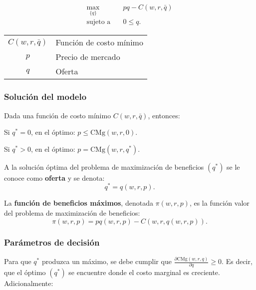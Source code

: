 \documentclass[8pt,a4paper]{extarticle}
\begin{document}
\begin{multicols}{3}
\begin{equation*}
\begin{aligned}
	\max_{\{q\}}\         & pq - C(w, r, \bar{q}) \\
    \text{sujeto a} \quad & 0 \le q.
\end{aligned}
\end{equation*}

\begin{center}
\begin{tabular}{ c l }
    \hline
	$C(w, r, \bar{q})$ & Función de costo mínimo \\
    $p$ & Precio de mercado \\
    $q$ & Oferta \\
    \hline
\end{tabular}
\end{center}

\subsubsection*{Solución del modelo}

Dada una función de costo mínimo $C (w, r, \bar{q})$, entonces:

\begin{bulletlist}
\item Si $q^* = 0$, en el óptimo: $p \le \text{CMg} (w, r, 0)$.
\item Si $q^* > 0$, en el óptimo: $p = \text{CMg} (w, r, q^*)$.
\end{bulletlist}

\begin{boxdef}[Oferta]
	A la solución óptima del problema de maximización de beneficios $(q^*)$ se le conoce como \textbf{oferta} y se denota:
	\[
		q^* = q(w, r, p)
	.\] 
\end{boxdef}

\begin{boxdef}
	La \textbf{función de beneficios máximos}, denotada $\pi(w, r, p)$, es la función valor del problema de maximización de beneficios:
	\[
		\pi (w, r, p) = pq(w, r, p) - C (w, r, q(w, r, p))
	.\] 
\end{boxdef}

\subsubsection*{Parámetros de decisión}

Para que $q^*$ produzca un máximo, se debe cumplir que $\displaystyle \frac{\partial \text{CMg} (w, r, q)}{\partial q} \ge 0$. Es decir, que el óptimo $(q^*)$ se encuentre donde el costo marginal es creciente. Adicionalmente:


\end{multicols}
\end{document}

